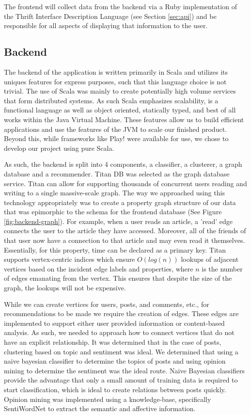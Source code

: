 \documentclass[11pt,letterpaper]{article}
\begin{document}
The frontend will collect data from the backend via a Ruby implementation of the Thrift Interface Description Language (see Section \ref{sec:api}) and be responsible for all aspects of displaying that information to the user.

\subsection{Backend}
The backend of the application is written primarily in Scala and utilizes its uniques features for express purposes, such that this language choice is not trivial. The use of Scala was mainly to create potentially high volume services that form distributed systems. As such Scala emphasizes scalability, is a functional language as well as object oriented, statically typed, and best of all works within the Java Virtual Machine. These features allow us to build efficient applications and use the features of the JVM to scale our finished product. Beyond this, while frameworks like Play! were available for use, we chose to develop our project using pure Scala.

As such, the backend is split into 4 components, a classifier, a clusterer, a graph database and a recommender. Titan DB was selected as the graph database service. Titan can allow for supporting thousands of concurrent users reading and writing to a single massive-scale graph. The way we approached using this technology appropriately was to create a property graph structure of our data that was epimorphic to the schema for the frontend database (See Figure \ref{fig:backend-graph}). For example, when a user reads an article, a 'read' edge connects the user to the article they have accessed. Moreover, all of the friends of that user now have a connection to that article and may even read it themselves. Essentially, for this property, time can be declared as a primary key. Titan supports vertex-centric indices which ensure $O(log(n))$ lookups of adjacent vertices based on the incident edge labels and properties, where $n$ is the number of edges emanating from the vertex. This ensures that despite the size of the graph, the lookups will not be expensive.

While we can create vertices for users, posts, and comments, etc., for recommendations to be made we require the creation of edges. These edges are implemented to support either user provided information or content-based analysis. As such, we needed to approach how to connect vertices that do not have an explicit relationship. It was determined that in the case of posts, clustering based on topic and sentiment was ideal. We determined that using a naive bayesian classifier to determine the topics of posts and using opinion mining to determine the sentiment was the ideal route. Naive Bayesian classifiers provide the advantage that only a small amount of training data is required to start classification, which is ideal to create relations between posts quickly. Opinion mining was implemented using a knowledge-base, specifically SentiWordNet to extract the semantic and affective information.
\end{document}
